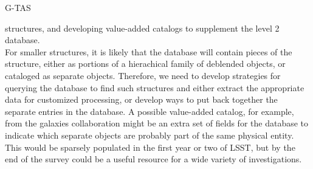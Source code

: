 \begin{tasklist}{G-TAS}
\begin{task}
{structures, and developing value-added catalogs to supplement the level 2 database.\\
For smaller structures, it is likely that the database will contain pieces 
of the structure, either as portions of a hierachical
family of deblended objects, or cataloged as separate objects. Therefore, we need to 
develop strategies for querying the database to find such structures and either extract
the appropriate data for customized processing, or develop ways to put back together
the separate entries in the database. A possible value-added catalog, for example, from
the galaxies collaboration might be an extra set of fields for the database to indicate 
which separate objects are probably part of the same physical entity. This would
be sparsely populated in the first year or two of LSST, but by the end of the survey 
could be a useful resource for a wide variety of investigations.
}

\end{task}


\end{tasklist}
